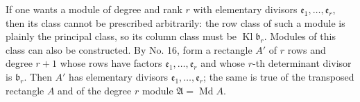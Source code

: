 \documentclass[11pt,a4paper]{article}
\newcommand{\Kl}{\operatorname{Kl}}
\begin{document}
If one wants a module of degree and rank \(r\) with elementary divisors \(\mathfrak e_1,\ldots,\mathfrak e_r\), then its class cannot be prescribed arbitrarily: the row class of such a module is plainly the principal class, so its column class must be \(\Kl\mathfrak b_r\). Modules of this class can also be constructed. By No. 16, form a rectangle \(A'\) of \(r\) rows and degree \(r+1\) whose rows have factors \(\mathfrak e_1,\ldots,\mathfrak e_r\) and whose \(r\)-th determinant divisor is \(\mathfrak b_r\). Then \(A'\) has elementary divisors \(\mathfrak e_1,\ldots,\mathfrak e_r\); the same is true of the transposed rectangle \(A\) and of the degree \(r\) module \(\mathfrak A=\operatorname{Md}A\).
\end{document}
